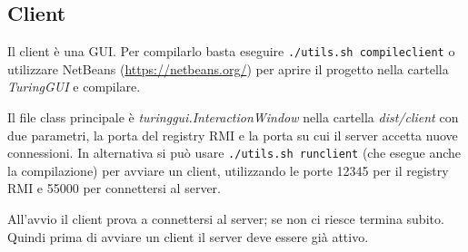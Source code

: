 \documentclass[a4paper]{article}
\theoremstyle{theorem}
\theoremstyle{remark}
\theoremstyle{definition}
\theoremstyle{corollary}
\theoremstyle{lemma}
\begin{document}
\subsection{Client}
Il client è una GUI. Per compilarlo basta eseguire \texttt{./utils.sh compileclient} o utilizzare NetBeans (\url{https://netbeans.org/}) per aprire il progetto nella cartella \textit{TuringGUI} e compilare.

Il file class principale è \textit{turinggui.InteractionWindow} nella cartella \textit{dist/client} con due parametri, la porta del registry RMI e la porta su cui il server accetta nuove connessioni.
In alternativa si può usare \texttt{./utils.sh runclient} (che esegue anche la compilazione) per avviare un client, utilizzando le porte 12345 per il registry RMI e 55000 per connettersi al server.

All'avvio il client prova a connettersi al server; se non ci riesce termina subito. Quindi prima di avviare un client il server deve essere già attivo.
\end{document}
